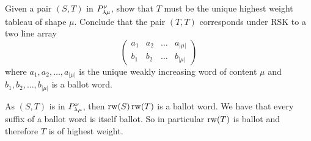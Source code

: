 \documentclass[12pt]{memoir}
\begin{document}
\begin{Ej}[7(b)]
    Given a pair $(S, T )$ in $P^\nu_{\lambda\mu}$, show that $T$ must be the unique highest weight tableau of shape $\mu$. Conclude that the pair $(T, T )$ corresponds under RSK to a two line array
    $$
    \begin{pmatrix}
        a_1&a_2&\dots&a_{|\mu|}\\
        b_1&b_2&\dots&b_{|\mu|}
    \end{pmatrix}
    $$
where $a_1,a_2,\dots,a_{|\mu|}$ is the unique weakly increasing word of content $\mu$ and $b_1,b_2,\dots,b_{|\mu|}$ is a ballot word.
\end{Ej}

\begin{ptcbr}
    As $(S,T)$ is in $P^{\nu}_{\lambda\mu}$, then $\operatorname{rw}(S)\operatorname{rw}(T)$ is a ballot word. We have that every suffix of a ballot word is itself ballot. So in particular $\operatorname{rw}(T)$ is ballot and therefore $T$ is of highest weight. 
\end{ptcbr}
\end{document}
